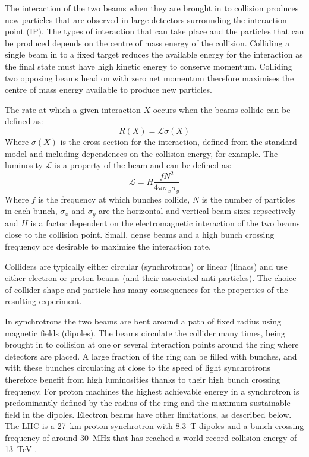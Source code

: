 The interaction of the two beams when they are brought in to collision produces new particles that are observed in large detectors surrounding the interaction point (IP). The types of interaction that can take place and the particles that can be produced depends on the centre of mass energy of the collision. Colliding a single beam in to a fixed target reduces the available energy for the interaction as the final state must have high kinetic energy to conserve momentum. Colliding two opposing beams head on with zero net momentum therefore maximises the centre of mass energy available to produce new particles.

The rate at which a given interaction \(X\) occurs when the beams collide can be defined as:
\begin{equation}
R(X) = \mathscr{L} \sigma(X)
\end{equation}
Where \(\sigma(X)\) is the cross-section for the interaction, defined from the standard model and including dependences on the collision energy, for example. The luminosity \(\mathscr{L}\) is a property of the beam and can be defined as:
\begin{equation}
\mathscr{L} = H\frac{fN^2}{4\pi\sigma_x\sigma_y}
\end{equation}
Where \(f\) is the frequency at which bunches collide, \(N\) is the number of particles in each bunch, \(\sigma_x\) and \(\sigma_y\) are the horizontal and vertical beam sizes repsectively and \(H\) is a factor dependent on the electromagnetic interaction of the two beams close to the collision point. Small, dense beams and a high bunch crossing frequency are desirable to maximise the interaction rate.


Colliders are typically either circular (synchrotrons) or linear (linacs) and use either electron or proton beams (and their associated anti-particles). The choice of collider shape and particle has many consequences for the properties of the resulting experiment. 

In synchrotrons the two beams are bent around a path of fixed radius using magnetic fields (dipoles). The beams circulate the collider many times, being brought in to collision at one or several interaction points around the ring where detectors are placed. A large fraction of the ring can be filled with bunches, and with these bunches circulating at close to the speed of light synchrotrons therefore benefit from high luminosities thanks to their high bunch crossing frequency. For proton machines the highest achievable energy in a synchrotron is predominantly defined by the radius of the ring and the maximum sustainable field in the dipoles. Electron beams have other limitations, as described below. The LHC is a 27~km proton synchrotron with 8.3~T dipoles and a bunch crossing frequency of around 30~MHz that has reached a world record collision energy of 13~TeV \cite{LHC}.

